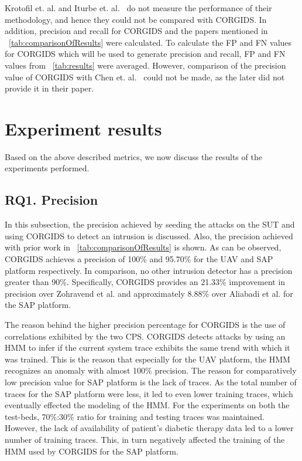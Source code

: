 Krotofil et. al. and Iturbe et. al.~\cite{krotofil2015process,iturbe2017feasibility} do not measure the performance of their methodology, and hence they could not be compared with \ac{CORGIDS}. In addition, precision and recall for \ac{CORGIDS} and the papers mentioned in ~\autoref{tab:comparisonOfResults} were calculated. To calculate the \ac{FP} and \ac{FN} values for \ac{CORGIDS} which will be used to generate precision and recall, \ac{FP} and \ac{FN} values from ~\autoref{tab:results} were averaged. However, comparison of the precision value of \ac{CORGIDS} with Chen et. al.~\cite{chen2018learning} could not be made, as the later did not provide it in their paper.  

\section{Experiment results} 
Based on the above described metrics, we now discuss the results of the experiments performed.

\subsection{RQ1. Precision}
In this subsection, the precision achieved by seeding the attacks on the \ac{SUT} and using \ac{CORGIDS} to detect an intrusion is discussed. Also,  the precision achieved with prior work in  ~\autoref{tab:comparisonOfResults} is shown. As can be observed, \ac{CORGIDS} achieves a precision of 100\% and 95.70\% for the \ac{UAV} and \ac{SAP} platform respectively. In comparison, no other intrusion detector has a precision greater than 90\%. Specifically, \ac{CORGIDS} provides an 21.33\% improvement in precision over Zohravend et al. \cite{zohrevand2016hidden} and approximately 8.88\% over Aliabadi et al. \cite{aliabadi2017artinali} for the \ac{SAP} platform.

The reason behind the higher precision percentage for \ac{CORGIDS} is the use of correlations exhibited by the two CPS. \ac{CORGIDS} detects attacks by using an \ac{HMM} to infer if the current system trace exhibits the same trend with which it was trained. This is the reason that especially for the \ac{UAV} platform, the \ac{HMM} recognizes an anomaly with almost 100\% precision. The reason for comparatively low precision value for \ac{SAP} platform is the lack of traces. As the total number of traces for the \ac{SAP} platform were less, it led to even lower training traces, which eventually effected the modeling of the \ac{HMM}. For the experiments on both the test-beds, 70\%:30\% ratio for training and testing traces was maintained. However, the lack of availability of patient's diabetic therapy data led to a lower number of training traces. This, in turn negatively affected the training of the \ac{HMM} used by \ac{CORGIDS} for the \ac{SAP} platform.

